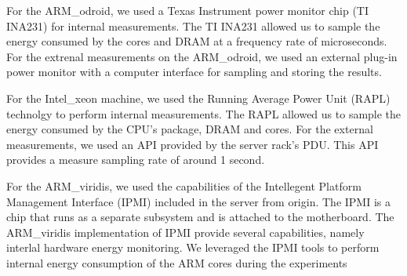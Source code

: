 For the ARM\_odroid, we used a Texas Instrument power monitor chip (TI INA231) for internal measurements. The TI INA231 allowed us to sample the energy consumed by the cores and DRAM at a frequency rate of microseconds. For the extrenal measurements on the ARM\_odroid, we used an external plug-in power monitor with a computer interface for sampling and storing the results.

For the Intel\_xeon machine, we used the Running Average Power Unit (RAPL) technolgy to perform internal measurements. The RAPL allowed us to sample the energy consumed by the CPU's package, DRAM and cores. For the external measurements, we used an API provided by the server rack's PDU. This API provides a measure sampling rate of around 1 second. 

For the ARM\_viridis, we used the capabilities of the Intellegent Platform Management Interface (IPMI) \cite{IPMI} included in the server from origin. The IPMI is a chip that runs as a separate subsystem and is attached to the motherboard. The ARM\_viridis implementation of IPMI provide several capabilities, namely interlal hardware energy monitoring. We leveraged the IPMI tools to perform internal energy consumption of the ARM cores during the experiments



